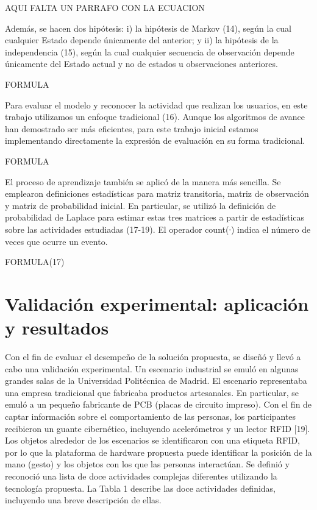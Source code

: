 \documentclass[a4paper]{article}
\begin{document}
AQUI FALTA UN PARRAFO CON LA ECUACION

Además, se hacen dos hipótesis: i) la hipótesis de Markov (14), según la cual cualquier Estado depende únicamente del anterior; y ii) la hipótesis de la independencia (15), según la cual cualquier secuencia de observación depende únicamente del Estado actual y no de estados u observaciones anteriores.

FORMULA

Para evaluar el modelo y reconocer la actividad que realizan los usuarios, en este trabajo utilizamos un enfoque tradicional (16). Aunque los algoritmos de avance han demostrado ser más eficientes, para este trabajo inicial estamos implementando directamente la expresión de evaluación en su forma tradicional.

FORMULA

El proceso de aprendizaje también se aplicó de la manera más sencilla. Se emplearon definiciones estadísticas para matriz transitoria, matriz de observación y matriz de probabilidad inicial. En particular, se utilizó la definición de probabilidad de Laplace para estimar estas tres matrices a partir de estadísticas sobre las actividades estudiadas (17-19). El operador count(∙) indica el número de veces que ocurre un evento.

FORMULA(17)


\section{Validación experimental: aplicación y resultados}

Con el fin de evaluar el desempeño de la solución propuesta, se diseñó y llevó a cabo una validación experimental. Un escenario industrial se emuló en algunas grandes salas de la Universidad Politécnica de Madrid. El escenario representaba una empresa tradicional que fabricaba productos artesanales. En particular, se emuló a un pequeño fabricante de PCB (placas de circuito impreso).
Con el fin de captar información sobre el comportamiento de las personas, los participantes recibieron un guante cibernético, incluyendo acelerómetros y un lector RFID [19]. Los objetos alrededor de los escenarios se identificaron con una etiqueta RFID, por lo que la plataforma de hardware propuesta puede identificar la posición de la mano (gesto) y los objetos con los que las personas interactúan.
Se definió y reconoció una lista de doce actividades complejas diferentes utilizando la tecnología propuesta. La Tabla 1 describe las doce actividades definidas, incluyendo una breve descripción de ellas.
\end{document}
